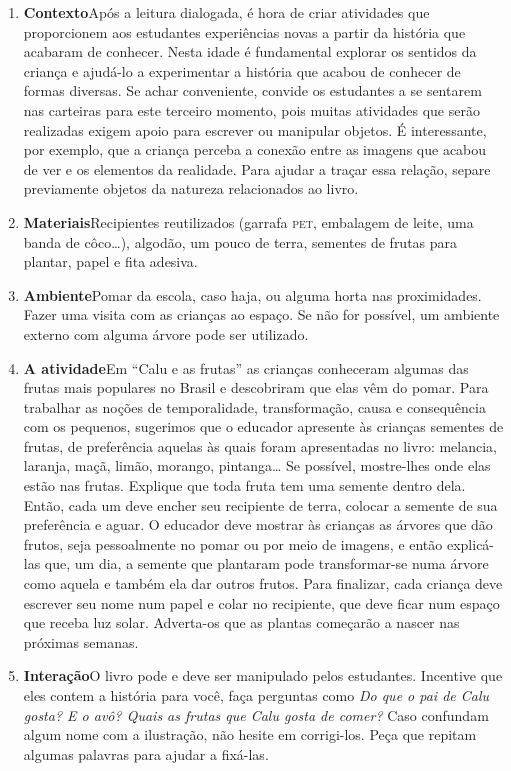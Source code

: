 \documentclass[11pt]{extarticle}
\begin{document}
\begin{enumerate}
\item \textbf{Contexto}\quad Após a leitura dialogada, é hora de criar 
atividades que proporcionem aos estudantes experiências novas a partir da história 
que acabaram de conhecer. Nesta idade é fundamental explorar os sentidos da criança e 
ajudá-lo a experimentar a história que acabou de conhecer de formas diversas. Se achar 
conveniente, convide os estudantes a se sentarem nas carteiras para este terceiro 
momento, pois muitas atividades que serão realizadas exigem apoio para escrever 
ou manipular objetos. É interessante, por exemplo, que a criança perceba a conexão 
entre as imagens que acabou de ver e os elementos da realidade. Para ajudar a traçar 
essa relação, separe previamente objetos da natureza relacionados ao livro. 

\item \textbf{Materiais}\quad Recipientes reutilizados (garrafa \textsc{pet}, 
embalagem de leite, uma banda de côco\dots{}), algodão, um pouco de terra, sementes
de frutas para plantar, papel e fita adesiva.

\item \textbf{Ambiente}\quad Pomar da escola, caso haja, ou alguma horta
nas proximidades. Fazer uma visita com as crianças ao espaço. Se não for 
possível, um ambiente externo com alguma árvore pode ser utilizado. 

\item \textbf{A atividade}\quad Em ``Calu e as frutas'' as crianças 
conheceram algumas das frutas mais populares no Brasil e descobriram 
que elas vêm do pomar. Para trabalhar as noções de temporalidade,
transformação, causa e consequência com os pequenos, sugerimos que
o educador apresente às crianças sementes de frutas, 
de preferência aquelas às quais foram apresentadas no livro: 
melancia, laranja, maçã, limão, morango, pintanga\dots{}
Se possível, mostre-lhes onde elas estão nas frutas. Explique
que toda fruta tem uma semente dentro dela. 
Então, cada um deve encher seu recipiente de terra, colocar
a semente de sua preferência e aguar. 
O educador deve mostrar às crianças as árvores
que dão frutos, seja pessoalmente no pomar ou por meio de 
imagens, e então explicá-las que, um dia, a semente que plantaram
pode transformar-se numa árvore como aquela e também ela dar outros 
frutos. 
Para finalizar, cada criança deve escrever seu nome num papel
e colar no recipiente, que deve ficar num espaço que receba luz solar. 
Adverta-os que as plantas começarão a nascer nas próximas semanas. 


\item \textbf{Interação}\quad O livro pode e deve ser 
manipulado pelos estudantes. Incentive que eles contem a história para 
você, faça perguntas como \emph{Do que o pai de Calu gosta? E o avô?
Quais as frutas que Calu gosta de comer?}
Caso confundam algum nome com a ilustração, não hesite em corrigi-los. 
Peça que repitam algumas palavras para ajudar a fixá-las.
\end{enumerate}
\end{document}
